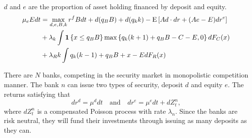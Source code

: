 \documentclass[a4paper, 12pt]{article}
\begin{document}
$d$ and $e$ are the proportion of asset holding financed by deposit 
and equity. 
\begin{equation}
    \begin{split}
        \mu_eEdt &= \max_{d,e,B,k} r^fBdt + d(q_BB) + d(q_kk) - {\operatorname{E}}\left[ {Ad\cdot dr + (Ae - E)dr^e} \right] \\
        &+ \lambda_k\int\mathbf{1}\left\{ {x\leq q_BB} \right\}\max\left\{ {q_k(k+1)+q_BB - C - E, 0} \right\}dF_C(x)\\ 
        &+ \lambda_Rk\int q_k(k-1) + q_BB + x - EdF_R(x)
    \end{split}
\end{equation}

There are $N$ banks, competing in the security market in monopolistic 
competition manner. The bank $n$ can issue two types of security,  
deposit $d$ and equity $e$. The returns satisfying that 
\begin{equation*}
    dr^d = \mu^ddt
    \quad\text{and}\quad 
    dr^e = \mu^edt + dZ_t^n, 
\end{equation*}
where $dZ_t^n$ is a compensated Poisson process with rate 
$\lambda_n$. Since the banks are risk neutral, they will 
fund their investments through issuing as many deposits as 
they can.




\end{document}
